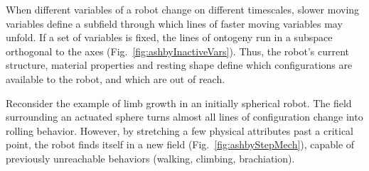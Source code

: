 \begin{enumerate}
    When different variables of a robot change on different timescales, slower moving variables define a subfield through which lines of faster moving variables may unfold.
    If a set of variables is fixed, the lines of ontogeny run in a subspace orthogonal to the axes (Fig.~\ref{fig:ashbyInactiveVars}).
    Thus, the robot's current structure, material properties and resting shape define which configurations are available to the robot, 
    and which are out of reach.
    
    Reconsider the example of limb growth in an initially spherical robot.
    The field 
    surrounding 
    an actuated sphere turns almost all lines of configuration change into rolling behavior.
    However, by stretching a few physical attributes past a critical point,
    the robot finds itself in a new field (Fig.~\ref{fig:ashbyStepMech}), capable of previously unreachable behaviors (walking, climbing, brachiation).
    
    
    
    
    
    
    



\end{enumerate}

